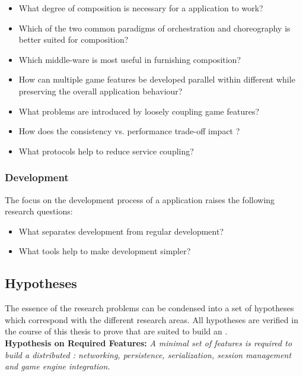 \begin{itemize}
  \item What degree of composition is necessary for a \ms{} application
  to work?
  \item Which of the two common paradigms of orchestration and choreography is
  better suited for \ms{} composition?
  \item Which middle-ware is most useful in furnishing \ms{} composition?
  \item How can multiple game features be developed parallel within different
  \mss{} while preserving the overall application behaviour?
  \item What problems are introduced by loosely coupling game features?
  \item How does the consistency vs. performance trade-off impact \ogs{}?
  \item What protocols help to reduce service coupling?
\end{itemize}

\subsubsection{\msuc{} Development}
The focus on the development process of a \ms{} application raises the
following research questions:

\begin{itemize}
  \item What separates \ms{} development from regular development?
  \item What tools help to make \ms{} development simpler?
\end{itemize}

\subsection{Hypotheses}
\label{sub:hypothesis}

The essence of the research problems can be condensed into a set of hypotheses
which correspond with the different research areas. All hypotheses are
verified in the course of this thesis to prove that \mss{} are suited to
build an \og{}.\\

\noindent\textbf{Hypothesis on Required Features:}
\textit{A minimal set of features is required to build a distributed \og{}:
networking, persistence, serialization, session management and game engine
integration.}\\

